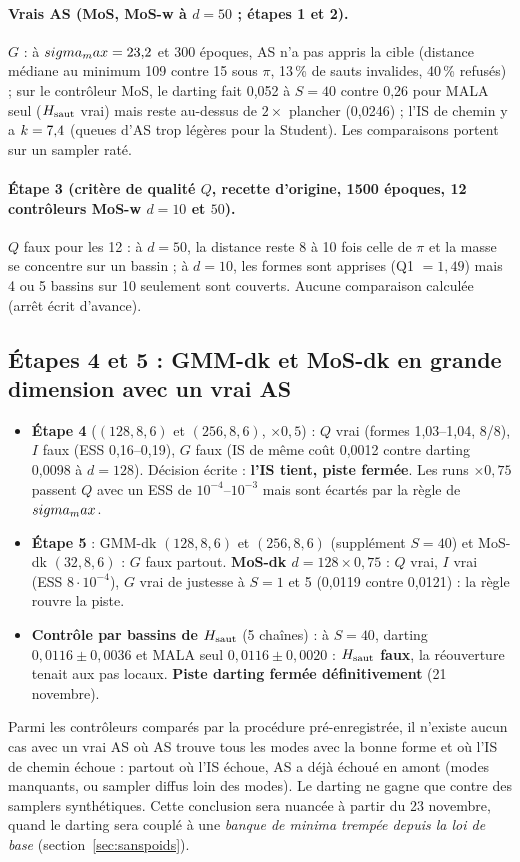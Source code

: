 \paragraph{Vrais AS (MoS, MoS-w à $d=50$ ; étapes 1 et 2).} $G$ \faux{} : à $sigma_max=23{,}2$ et 300 époques, AS n'a pas appris la cible (distance médiane au minimum 109 contre 15 sous $\pi$, 13\,\% de sauts invalides, 40\,\% refusés) ; sur le contrôleur MoS, le darting fait 0,052 à $S=40$ contre 0,26 pour MALA seul ($H_{\rm saut}$ vrai) mais reste au-dessus de $2\times$ plancher (0,0246) ; l'IS de chemin y a $k=7{,}4$ (queues d'AS trop légères pour la Student). Les comparaisons portent sur un sampler raté.
\paragraph{Étape 3 (critère de qualité $Q$, recette d'origine, 1500 époques, 12 contrôleurs MoS-w $d=10$ et $50$).} $Q$ faux pour les 12 : à $d=50$, la distance reste 8 à 10 fois celle de $\pi$ et la masse se concentre sur un bassin ; à $d=10$, les formes sont apprises (Q1 $=1{,}49$) mais 4 ou 5 bassins sur 10 seulement sont couverts. Aucune comparaison calculée (arrêt écrit d'avance).

\subsection{Étapes 4 et 5 : GMM-dk et MoS-dk en grande dimension avec un vrai AS}
\begin{itemize}
  \item \textbf{Étape 4} ($(128,8,6)$ et $(256,8,6)$, $\times0{,}5$) : $Q$ vrai (formes 1,03--1,04, 8/8), $I$ faux (ESS 0,16--0,19), $G$ faux (IS de même coût 0,0012 contre darting 0,0098 à $d=128$). Décision écrite : \textbf{l'IS tient, piste fermée}. Les runs $\times0{,}75$ passent $Q$ avec un ESS de $10^{-4}$--$10^{-3}$ mais sont écartés par la règle de $sigma_max$.
  \item \textbf{Étape 5} : GMM-dk $(128,8,6)$ et $(256,8,6)$ (supplément $S=40$) et MoS-dk $(32,8,6)$ : $G$ faux partout. \textbf{MoS-dk $d=128\times0{,}75$} : $Q$ vrai, $I$ vrai (ESS $8\cdot10^{-4}$), $G$ vrai de justesse à $S=1$ et 5 (0,0119 contre 0,0121) : la règle rouvre la piste.
  \item \textbf{Contrôle par bassins de $H_{\rm saut}$} (5 chaînes) : à $S=40$, darting $0{,}0116\pm0{,}0036$ et MALA seul $0{,}0116\pm0{,}0020$ : \textbf{$H_{\rm saut}$ faux}, la réouverture tenait aux pas locaux. \textbf{Piste darting fermée définitivement} (21 novembre).
\end{itemize}

\begin{remark}
Parmi les contrôleurs comparés par la procédure pré-enregistrée, il n'existe aucun cas avec un vrai AS où AS trouve tous les modes avec la bonne forme et où l'IS de chemin échoue : partout où l'IS échoue, AS a déjà échoué en amont (modes manquants, ou sampler diffus loin des modes). Le darting ne gagne que contre des samplers synthétiques. Cette conclusion sera nuancée à partir du 23 novembre, quand le darting sera couplé à une \emph{banque de minima trempée depuis la loi de base} (section~\ref{sec:sanspoids}).
\end{remark}
